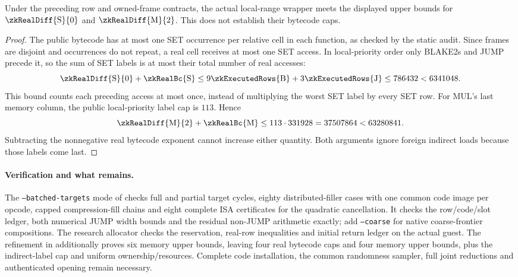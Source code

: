 \begin{lemma}\label{lem:zk-set-mul-residual-bounds}
Under the preceding row and owned-frame contracts, the actual local-range wrapper meets the displayed upper bounds for $\zkRealDiff{\mathrm S}{0}$ and $\zkRealDiff{\mathrm M}{2}$. This does not establish their bytecode caps.
\end{lemma}
\begin{proof}
The public bytecode has at most one SET occurrence per relative cell in each function, as checked by the static audit. Since frames are disjoint and occurrences do not repeat, a real cell receives at most one SET access. In local-priority order only BLAKE2s and JUMP precede it, so the sum of SET labels is at most their total number of real accesses:
\[
 \zkRealDiff{\mathrm S}{0}+\zkRealBc{\mathrm S}
 \le9\zkExecutedRows{\mathrm B}+3\zkExecutedRows{\mathrm J}
 \le786432<6341048.
\]
This bound counts each preceding access at most once, instead of multiplying the worst SET label by every SET row. For MUL's last memory column, the public local-priority label cap is $113$. Hence
\[
 \zkRealDiff{\mathrm M}{2}+\zkRealBc{\mathrm M}
 \le113\cdot331928=37507864<63280841.
\]
Subtracting the nonnegative real bytecode exponent cannot increase either quantity. Both arguments ignore foreign indirect loads because those labels come last.
\end{proof}

\paragraph{Verification and what remains.} The \texttt{--batched-targets} mode of  checks full and partial target cycles, eighty distributed-filler cases with one common code image per opcode, capped compression-fill chains and eight complete ISA certificates for the quadratic cancellation. It checks the row/code/slot ledger, both numerical JUMP width bounds and the residual non-JUMP arithmetic exactly; add \texttt{--coarse} for native coarse-frontier compositions. The research allocator checks the reservation, real-row inequalities and initial return ledger on the actual guest. The refinement in  additionally proves six memory upper bounds, leaving four real bytecode caps and four memory upper bounds, plus the indirect-label cap and uniform ownership/resources. Complete code installation, the common randomness sampler, full joint reductions and authenticated opening remain necessary.
